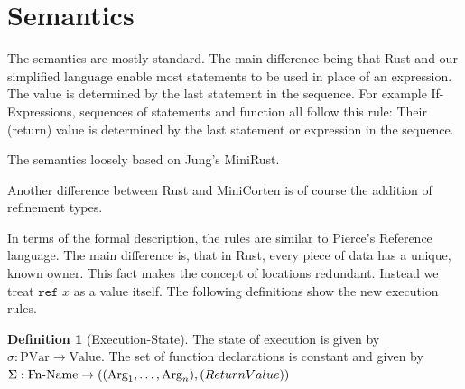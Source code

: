 \documentclass{book}
\newcommand{\code}[1]{\texttt{#1}}
\theoremstyle{definition}
\newtheorem{definition}[theorem]{Definition}
\begin{document}
\section{Semantics}

The semantics are mostly standard. The main difference being that Rust and our simplified language enable most statements to be used in place of an expression. The value is determined by the last statement in the sequence. For example If-Expressions, sequences of statements and function all follow this rule: Their (return) value is determined by the last statement or expression in the sequence.

The semantics loosely based on Jung's MiniRust.

Another difference between Rust and MiniCorten is of course the addition of refinement types.

In terms of the formal description, the rules are similar to Pierce's \cite[p. 166f]{pierce_types_2002-3} Reference language. %
The main difference is, that in Rust, every piece of data has a unique, known owner. This fact makes the concept of locations redundant. Instead we treat $\code{ref } x$ as a value itself. The following definitions show the new execution rules.

\begin{definition}[Execution-State]
  The state of execution is given by $\sigma : \text{PVar} \to \text{Value}$. The set of function declarations is constant and given by $\Sigma : \text{Fn-Name} \to ((\text{Arg}_1, \dots, \text{Arg}_n), \text(ReturnValue))$
\end{definition}
\end{document}
